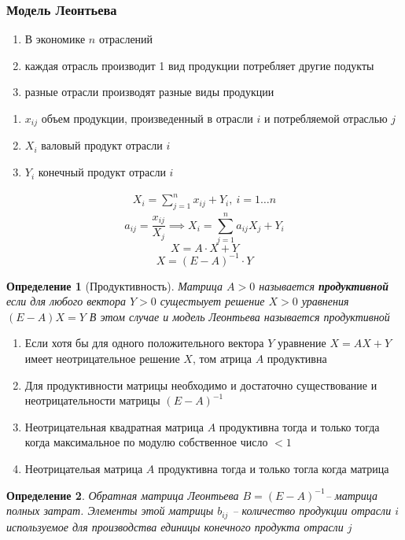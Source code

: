 \documentclass[14pt]{extarticle}
\newtheorem{definition}{Определение}
\begin{document}
	\subsubsection{Модель Леонтьева}
	\begin{enumerate}
		\item В экономике $n$ отраслений
		\item каждая отрасль производит 1 вид продукции потребляет другие подукты
		\item разные отрасли производят разные виды продукции
	\end{enumerate}
	\begin{enumerate}
		\item $x_{ij}$ объем продукции, произведенный
			в отрасли $i$ и потребляемой отраслью  $j$
		\item  $X_{i}$ валовый продукт отрасли $i$
		\item  $Y_{i}$ конечный продукт отрасли $i$
	\end{enumerate}
	\begin{eqnarray}
		X_{i} = \sum_{j = 1}^{n} x_{ij} + Y_{i},~ i = 1 \dots n
	\end{eqnarray}
	\begin{equation}
		a_{ij} = \frac{x_{ij}}{X_{j}} \implies X_{i}= \sum_{j=1}^{n} a_{ij} X_{j} + Y_{i}
	\end{equation}
	\begin{equation}
		X = A\cdot X + Y
	\end{equation}
	\begin{equation}
		X = (E-A)^{-1} \cdot Y
	\end{equation}
	\begin{definition}[Продуктивность]
		Матрица $A>0$ называется \textbf{продуктивной}
		если для любого вектора  $Y > 0$ 
		сущестыует решение  $X>0$ уравнения  $(E-A)X  = Y$ 
		В этом случае и модель Леонтьева называется продуктивной
	\end{definition}
	\begin{enumerate}
		\item Если хотя бы для одного
			положительного вектора $Y$ 
			уравнение  $X=AX + Y$ имеет неотрицательное
			решение  $X$, том атрица  $A$ продуктивна
		\item
			Для
			продуктивности матрицы необходимо и достаточно существование и неотрицательности матрицы  $(E -A)^{-1}$
		 \item Неотрицательная квадратная матрица $A$ 
			 продуктивна тогда и только тогда 
			 когда максимальное по модулю собственное число  $<1$ 
		\item Неотрицательая матрица $A$ 
			продуктивна тогда и только тогла
			когда матрица 
	\end{enumerate}
	\begin{definition}
		Обратная матрица Леонтьева $B = (E - A)^{-1}$--
		матрица полных затрат. Элементы этой матрицы 
		$b_{ij}$ -- количество продукции отрасли $i$ 
		используемое для производства единицы конечного продукта отрасли  $j$
	\end{definition}
\end{document}

